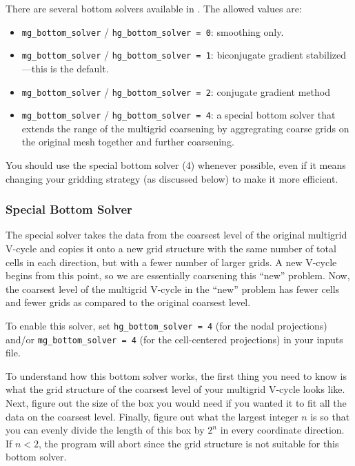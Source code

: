 There are several bottom solvers available in \BoxLib.  
The allowed values are:
\begin{itemize}

\item {\tt mg\_bottom\_solver} / {\tt hg\_bottom\_solver = 0}: smoothing only.

\item {\tt mg\_bottom\_solver} / {\tt hg\_bottom\_solver = 1}: biconjugate
  gradient stabilized---this is the default.

\item {\tt mg\_bottom\_solver} / {\tt hg\_bottom\_solver = 2}: conjugate
  gradient method

\item {\tt mg\_bottom\_solver} / {\tt hg\_bottom\_solver = 4}: a special 
  bottom solver that extends the range of the multigrid coarsening
  by aggregrating coarse grids on the original mesh together and
  further coarsening.

\end{itemize}

You should use the special bottom solver (4) whenever possible, even
if it means changing your gridding strategy (as discussed below) to 
make it more efficient.


\subsubsection{Special Bottom Solver}

The special solver takes the data from the coarsest level of the
original multigrid V-cycle and copies it onto a new grid structure with
the same number of total cells in each direction, but with a fewer
number of larger grids.  A new V-cycle begins from this point, so we
are essentially coarsening this ``new'' problem.  Now, the coarsest
level of the multigrid V-cycle in the ``new'' problem has fewer cells
and fewer grids as compared to the original coarsest level.

To enable this solver, set {\tt hg\_bottom\_solver = 4} (for the nodal
projections) and/or {\tt mg\_bottom\_solver = 4} (for the
cell-centered projections) in your inputs file.

To understand how this bottom solver works, the first thing you need
to know is what the grid structure of the coarsest level of your
multigrid V-cycle looks like.  Next, figure out the size of the box you
would need if you wanted it to fit all the data on the coarsest level.
Finally, figure out what the largest integer $n$ is so that you can evenly
divide the length of this box by $2^n$ in every coordinate direction.
If $n < 2$, the program will abort since the grid structure is not
suitable for this bottom solver.

